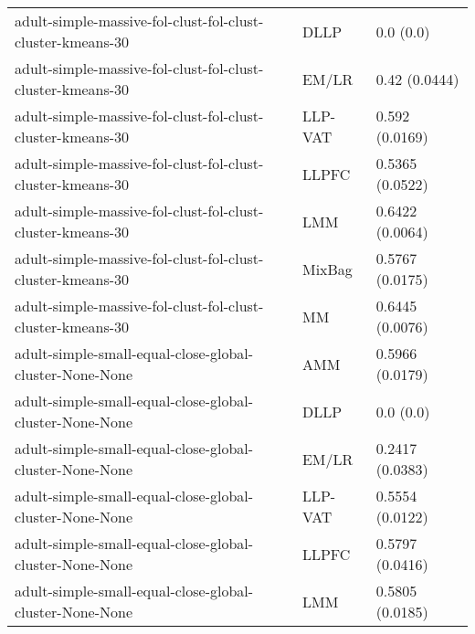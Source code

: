 \begin{longtable}{lll}
                                                   adult-simple-massive-fol-clust-fol-clust-cluster-kmeans-30 &      DLLP &                             0.0 (0.0) \\
                                                   adult-simple-massive-fol-clust-fol-clust-cluster-kmeans-30 &     EM/LR &                         0.42 (0.0444) \\
                                                   adult-simple-massive-fol-clust-fol-clust-cluster-kmeans-30 &   LLP-VAT &                        0.592 (0.0169) \\
                                                   adult-simple-massive-fol-clust-fol-clust-cluster-kmeans-30 &     LLPFC &                       0.5365 (0.0522) \\
                                                   adult-simple-massive-fol-clust-fol-clust-cluster-kmeans-30 &       LMM &                       0.6422 (0.0064) \\
                                                   adult-simple-massive-fol-clust-fol-clust-cluster-kmeans-30 &    MixBag &                       0.5767 (0.0175) \\
                                                   adult-simple-massive-fol-clust-fol-clust-cluster-kmeans-30 &        MM &                       0.6445 (0.0076) \\
                                                      adult-simple-small-equal-close-global-cluster-None-None &       AMM &                       0.5966 (0.0179) \\
                                                      adult-simple-small-equal-close-global-cluster-None-None &      DLLP &                             0.0 (0.0) \\
                                                      adult-simple-small-equal-close-global-cluster-None-None &     EM/LR &                       0.2417 (0.0383) \\
                                                      adult-simple-small-equal-close-global-cluster-None-None &   LLP-VAT &                       0.5554 (0.0122) \\
                                                      adult-simple-small-equal-close-global-cluster-None-None &     LLPFC &                       0.5797 (0.0416) \\
                                                      adult-simple-small-equal-close-global-cluster-None-None &       LMM &                       0.5805 (0.0185) \\

\end{longtable}
